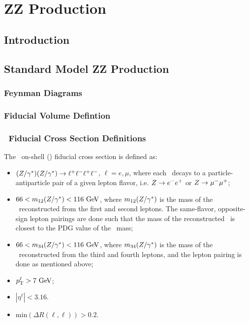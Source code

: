 \graphicspath{{Chapters/TheoryZZProduction/Figures/}}
\chapter{ZZ Production}
\label{chap:TheoryZZProduction}

\section{Introduction}
\section{Standard Model ZZ Production}
\subsection{Feynman Diagrams}
\subsection{Fiducial Volume Defintion}

\subsection{\zzllll\ Fiducial Cross Section Definitions}

The \zzllll\ on-shell (\ZZ) fiducial cross section is defined as:
\begin{itemize}
\item{$(Z/\gamma^*)(Z/\gamma^*)\rightarrow\ell^+ \ell^-\ell^+ \ell^-$, $\ell = e,\mu$,
where each \Z\ decays to a particle-antiparticle pair of a given lepton flavor,
i.e. $Z\rightarrow e^{-}e^{+}$ or $Z\rightarrow \mu^{-}\mu^{+}$;}
\item{ $66 < m_{12}(\Z/\gamma^*) <  116\GeV$, where $m_{12}(Z/\gamma^*)$ is
the mass of the \Z\ reconstructed from the first and second leptons.  The
same-flavor, opposite-sign lepton pairings are done such that the mass of the 
reconstructed \Z\ is closest to the PDG value of the \Z\ mass;}
\item{ $66 < m_{34}(\Z/\gamma^*) <  116\GeV$, where $m_{34}(Z/\gamma^*)$ is
the mass of the \Z\ reconstructed from the third and fourth leptons, and the
lepton pairing is done as mentioned above;}
\item $\pT^{\ell} > 7\GeV$;
\item $|\eta^{\ell}| < 3.16$.
\item{$\mathrm{min}(\Delta R(\ell,\ell)) > 0.2$.}
\end{itemize}


